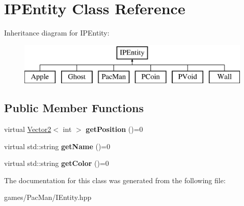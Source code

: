 \hypertarget{class_i_p_entity}{}\section{I\+P\+Entity Class Reference}
\label{class_i_p_entity}
Inheritance diagram for I\+P\+Entity\+:\begin{figure}[H]
\begin{center}
\leavevmode
\includegraphics[height=2.000000cm]{class_i_p_entity}
\end{center}
\end{figure}
\subsection*{Public Member Functions}
\begin{DoxyCompactItemize}
\item 
\mbox{\label{class_i_p_entity_ac2d45f995beb9a39f117b93e0c87f7a4}} 
virtual \hyperlink{struct_vector2}{Vector2}$<$ int $>$ {\bfseries get\+Position} ()=0
\item 
\mbox{\label{class_i_p_entity_aee49045a3d435ab19ad0f74ca732c347}} 
virtual std\+::string {\bfseries get\+Name} ()=0
\item 
\mbox{\label{class_i_p_entity_a1e205532c04d76b77520e434661c0a52}} 
virtual std\+::string {\bfseries get\+Color} ()=0
\end{DoxyCompactItemize}


The documentation for this class was generated from the following file\+:\begin{DoxyCompactItemize}
\item 
games/\+Pac\+Man/I\+Entity.\+hpp\end{DoxyCompactItemize}
